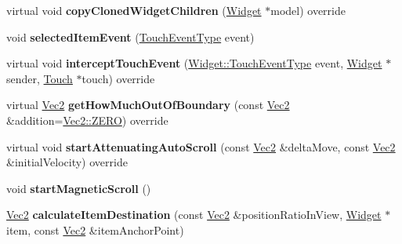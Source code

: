 \begin{DoxyCompactItemize}
\item 
\mbox{\label{classui_1_1ListView_af33a33b3e7da9dbb50ecf33b0dcada3e}} 
virtual void {\bfseries copy\+Cloned\+Widget\+Children} (\hyperlink{classui_1_1Widget}{Widget} $\ast$model) override
\item 
\mbox{\label{classui_1_1ListView_a44bec6d5b26502059a40f056a8ae16e1}} 
void {\bfseries selected\+Item\+Event} (\hyperlink{classui_1_1Widget_a4829c0f1cbaf1fd820a9b2ccf0c58c73}{Touch\+Event\+Type} event)
\item 
\mbox{\label{classui_1_1ListView_a06d484208fd82024f323d86d59a4f21b}} 
virtual void {\bfseries intercept\+Touch\+Event} (\hyperlink{classui_1_1Widget_a4829c0f1cbaf1fd820a9b2ccf0c58c73}{Widget\+::\+Touch\+Event\+Type} event, \hyperlink{classui_1_1Widget}{Widget} $\ast$sender, \hyperlink{classTouch}{Touch} $\ast$touch) override
\item 
\mbox{\label{classui_1_1ListView_a3c52f4a404b13d8fc2458711cea4b1cf}} 
virtual \hyperlink{classVec2}{Vec2} {\bfseries get\+How\+Much\+Out\+Of\+Boundary} (const \hyperlink{classVec2}{Vec2} \&addition=\hyperlink{classVec2_a5c80e2e7c8bd2adcbad2844d060e6245}{Vec2\+::\+Z\+E\+RO}) override
\item 
\mbox{\label{classui_1_1ListView_af7c9c210a6ce32d355092aa5ece10b42}} 
virtual void {\bfseries start\+Attenuating\+Auto\+Scroll} (const \hyperlink{classVec2}{Vec2} \&delta\+Move, const \hyperlink{classVec2}{Vec2} \&initial\+Velocity) override
\item 
\mbox{\label{classui_1_1ListView_a9331e4ab296569082819c855edcd0a91}} 
void {\bfseries start\+Magnetic\+Scroll} ()
\item 
\mbox{\label{classui_1_1ListView_a4ac5978c0152bbca5b822c2418068a51}} 
\hyperlink{classVec2}{Vec2} {\bfseries calculate\+Item\+Destination} (const \hyperlink{classVec2}{Vec2} \&position\+Ratio\+In\+View, \hyperlink{classui_1_1Widget}{Widget} $\ast$item, const \hyperlink{classVec2}{Vec2} \&item\+Anchor\+Point)
\item 
\mbox{\label{classui_1_1ListView_a154aefebe8fe8233034d5d4856e6901e}} 

\end{DoxyCompactItemize}
